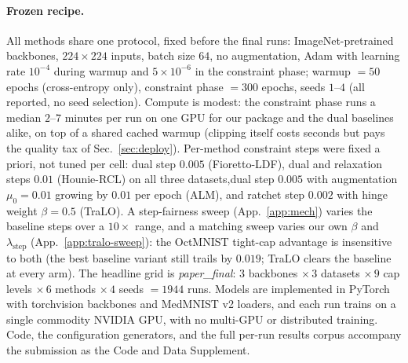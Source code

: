 \documentclass[10pt]{article}
\begin{document}
\paragraph{Frozen recipe.}
All methods share one protocol, fixed before the final runs:
ImageNet-pretrained backbones, $224{\times}224$ inputs, batch size $64$, no
augmentation, Adam with learning rate $10^{-4}$ during warmup and
$5{\times}10^{-6}$ in the constraint phase; warmup $=50$ epochs
(cross-entropy only), constraint phase $=300$ epochs, seeds $1$--$4$ (all
reported, no seed selection). Compute is modest: the constraint phase runs
a median $2$--$7$ minutes per run on one GPU for our package and the dual
baselines alike, on top of a shared cached warmup (clipping itself costs
seconds but pays the quality tax of Sec.~\ref{sec:deploy}). Per-method
constraint steps were fixed a priori, not tuned per cell: dual step $0.005$
(Fioretto-LDF), dual and relaxation steps $0.01$ (Hounie-RCL) on all three
datasets,{dual step $0.005$ with augmentation $\mu_0{=}0.01$ growing
by $0.01$ per epoch (ALM),} and ratchet step $0.002$ with hinge weight
$\beta{=}0.5$ (TraLO).
A step-fairness sweep (App.~\ref{app:mech}) varies the baseline steps
over a $10\times$ range, and a matching sweep varies our own $\beta$ and
$\lambda_{\text{step}}$ (App.~\ref{app:tralo-sweep}): the OctMNIST
tight-cap advantage is insensitive to both (the best baseline variant still
trails by $0.019$; TraLO clears the baseline at every arm). The headline
grid is \emph{paper\_final}: $3$ backbones $\times\,3$ datasets $\times\,9$
cap levels $\times\,6$ methods $\times\,4$ seeds $=1944$ runs. Models are
implemented in PyTorch with torchvision backbones and MedMNIST v2 loaders,
and each run trains on a single commodity NVIDIA GPU, with no multi-GPU or
distributed training. Code, the configuration generators, and the full
per-run results corpus accompany the submission as the Code and Data
Supplement.
\end{document}
